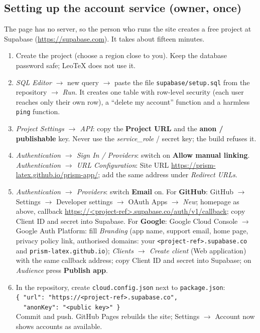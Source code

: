 \documentclass[11pt,a4paper]{article}
\newcommand{\leotex}{Leo\TeX{}}
\newcommand{\fpath}[1]{\texttt{\small #1}}
\begin{document}
\subsection{Setting up the account service (owner, once)}
\label{sec:owner}
The page has no server, so the person who runs the site creates a free project at Supabase (\url{https://supabase.com}). It takes about fifteen minutes.
\begin{enumerate}
  \item Create the project (choose a region close to you). Keep the database password safe; \leotex{} does not use it.
  \item \emph{SQL Editor} $\rightarrow$ new query $\rightarrow$ paste the file \fpath{supabase/setup.sql} from the repository $\rightarrow$ \emph{Run}. It creates one table with
        row-level security (each user reaches only their own row), a ``delete my account'' function and a harmless \texttt{ping} function.
  \item \emph{Project Settings $\rightarrow$ API}: copy the \textbf{Project URL} and the \textbf{anon / publishable} key. Never use the \emph{service\_role} / secret key; the
        build refuses it.
  \item \emph{Authentication $\rightarrow$ Sign In / Providers}: switch on \textbf{Allow manual linking}. \emph{Authentication $\rightarrow$ URL Configuration}: Site URL \url{https://prism-latex.github.io/prism-app/}; add the same address under \emph{Redirect URLs}.
  \item \emph{Authentication $\rightarrow$ Providers}: switch \textbf{Email} on. For \textbf{GitHub}: GitHub $\rightarrow$ Settings $\rightarrow$ Developer settings $\rightarrow$ OAuth Apps $\rightarrow$
        \emph{New}; homepage as above, callback \url{https://<project-ref>.supabase.co/auth/v1/callback}; copy Client ID and secret into Supabase. For \textbf{Google}:
        Google Cloud Console $\rightarrow$ Google Auth Platform: fill \emph{Branding} (app name, support email, home page, privacy policy link, authorised domains: your \texttt{<project-ref>.supabase.co} and \texttt{prism-latex.github.io}); \emph{Clients $\rightarrow$ Create client} (Web application) with the same callback address; copy Client ID
        and secret into Supabase; on \emph{Audience} press \textbf{Publish app}.
  \item In the repository, create \fpath{cloud.config.json} next to \fpath{package.json}:\\
        \verb|{ "url": "https://<project-ref>.supabase.co",|\\
        \verb|  "anonKey": "<public key>" }|\\
        Commit and push. GitHub Pages rebuilds the site; Settings $\rightarrow$ Account now shows accounts as available.
\end{enumerate}
\end{document}

